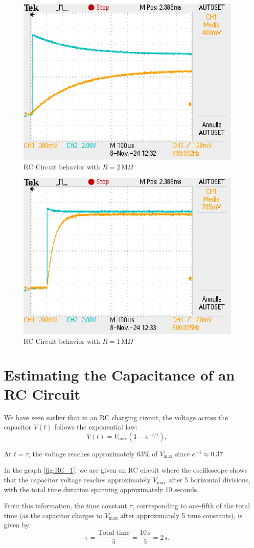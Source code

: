 \documentclass[notitlepage]{report}
\numberwithin{equation}{section}
\theoremstyle{plain}
\theoremstyle{definition}
\theoremstyle{remark}
\begin{document}
\begin{figure}[h!]
    \centering
    \includegraphics[width=0.4\linewidth]{figures/RC_graph_3.JPG}
    \caption{RC Circuit behavior with \(R = 2 \, \text{M}\Omega\)}
    \label{fig:RC_3}
\end{figure}

\begin{figure}[h!]
    \centering
    \includegraphics[width=0.4\linewidth]{figures/RC_graph_4.JPG}
    \caption{RC Circuit behavior with \(R = 1 \, \text{M}\Omega\)}
    \label{fig:RC_4}
\end{figure}

\section*{Estimating the Capacitance of an RC Circuit}

We have seen earlier that in an RC charging circuit, the voltage across the capacitor \( V(t) \) follows the exponential law:
\[
V(t) = V_{\text{max}} \left( 1 - e^{-t / \tau} \right),
\]

At \( t = \tau \), the voltage reaches approximately \( 63\% \) of \( V_{\text{max}} \) since \( e^{-1} \approx 0.37 \).

In the graph \ref{fig:RC_1}, we are given an RC circuit where the oscilloscope shows that the capacitor voltage reaches approximately \( V_{\text{max}} \) after 5 horizontal divisions, with the total time duration spanning approximately 10 seconds.

From this information, the time constant \( \tau \), corresponding to one-fifth of the total time (as the capacitor charges to \( V_{\text{max}} \) after approximately 5 time constants), is given by:  
\[
\tau = \frac{\text{Total time}}{5} = \frac{10 \, \text{s}}{5} = 2 \, \text{s}.
\]
\end{document}
